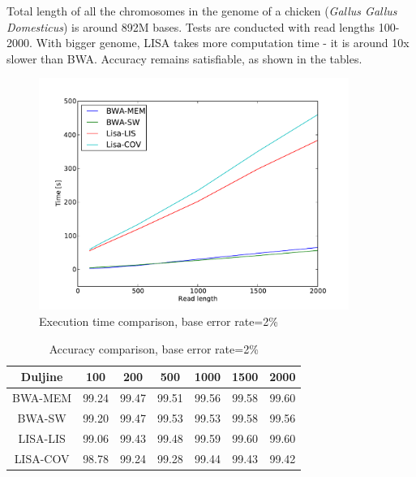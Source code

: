 \documentclass[times, utf8, diplomski]{fer}
\begin{document}
Total length of all the chromosomes in the genome of a chicken (\emph{Gallus Gallus Domesticus}) is around 892M bases. Tests are conducted with read lengths 100-2000. With bigger genome, LISA takes more computation time - it is around 10x slower than BWA. Accuracy remains satisfiable, as shown in the tables.


\begin{figure}[H]
\centering
\includegraphics[width=0.9\textwidth]{../img/chicken-e02-time.pdf}
\caption{Execution time comparison, base error rate=2\%}\label{chicken-e02-time}
\end{figure}

\begin{table}[H]
\centering
\begin{tabular}{|c||c|c|c|c|c|c|}
\hline
	Duljine & 100 & 200 & 500 & 1000 & 1500 & 2000\\
\hline
\hline
	BWA-MEM & 99.24 & 99.47 & 99.51 & 99.56 & 99.58 & 99.60\\
\hline
	BWA-SW  & 99.20 & 99.47 & 99.53 & 99.53 & 99.58 & 99.56\\
\hline
	LISA-LIS   & 99.06 & 99.43 & 99.48 & 99.59 & 99.60 & 99.60\\
\hline
	LISA-COV & 98.78 & 99.24 & 99.28 & 99.44 & 99.43 & 99.42\\
\hline
\end{tabular}
\caption{Accuracy comparison, base error rate=2\%}\label{chicken-e02-correct}
\end{table}
\end{document}
